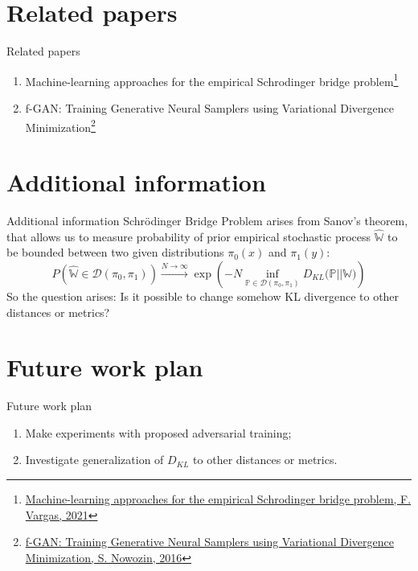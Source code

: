 \documentclass[10pt,pdf,hyperref={unicode}]{beamer}
\begin{document}
\section{Related papers}
\begin{frame}{Related papers}
\begin{enumerate}[1.]
    \item Machine-learning approaches for the empirical Schrodinger bridge problem\footnote{\href{https://www.cl.cam.ac.uk/techreports/UCAM-CL-TR-958.pdf}{Machine-learning approaches for the empirical Schrodinger bridge problem, F. Vargas, 2021}}
    \item f-GAN: Training Generative Neural Samplers using Variational Divergence Minimization\footnote{\href{https://arxiv.org/abs/1606.00709}{f-GAN: Training Generative Neural Samplers using Variational Divergence Minimization, S. Nowozin, 2016}}
\end{enumerate}
\end{frame}
\section{Additional information}
\begin{frame}{Additional information}
    Schrödinger Bridge Problem arises from Sanov's theorem, that allows us to measure probability of prior empirical stochastic process $\hat{\mathbb{W}}$ to be bounded between two given distributions $\pi_0(x)$ and $\pi_1(y)$:
    \begin{equation*}
        P\left(\hat{\mathbb{W}} \in \mathcal{D}(\pi_0, \pi_1)\right) \xrightarrow{N\rightarrow \infty} \exp\left(-N\inf_{\mathbb{P} \in \mathcal{D}(\pi_0, \pi_1)}D_{KL}\mathbb{(P||W})\right)
    \end{equation*}
    So the question arises: Is it possible to change somehow KL divergence to other distances or metrics?
\end{frame}
\section{Future work plan}
\begin{frame}{Future work plan}
\begin{enumerate}[1.]
    \item Make experiments with proposed adversarial training;
    \item Investigate generalization of $D_{KL}$ to other distances or metrics.
\end{enumerate}
\end{frame}
\end{document}
